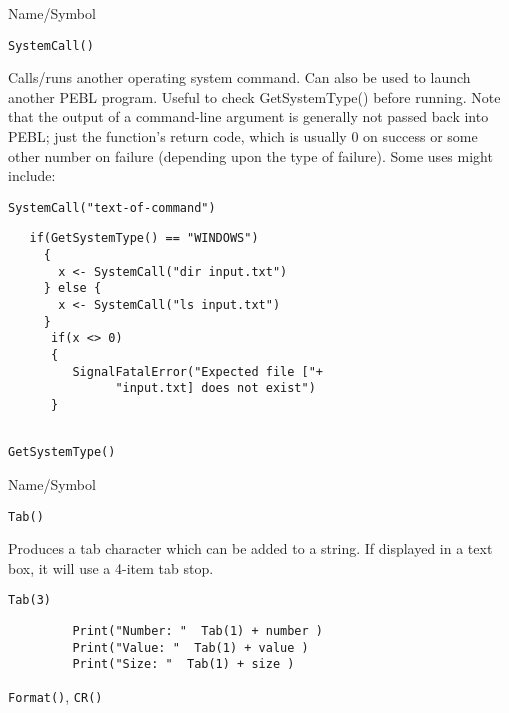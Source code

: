 \begin{desc}{Name/Symbol}
\item[Name/Symbol]  	\verb+SystemCall()+

\item[Description] Calls/runs another operating system command.  Can also be used to 
launch another PEBL program.  Useful to check GetSystemType() before running.
 Note that the output of a
   command-line argument is generally not passed back into PEBL; just
   the function's return code, which is usually 0 on success or some
   other number on failure (depending upon the type of failure).  Some
   uses might include:

\item[Usage]		
\begin{verbatim}
SystemCall("text-of-command")
\end{verbatim}

\item[Example]	
\begin{verbatim}
   if(GetSystemType() == "WINDOWS")
     {
       x <- SystemCall("dir input.txt") 
     } else {
       x <- SystemCall("ls input.txt") 
     }
      if(x <> 0)
      {
         SignalFatalError("Expected file ["+
               "input.txt] does not exist")
      }


\end{verbatim}

\item[See Also]	
  \verb+GetSystemType()+
\end{desc}

\vfill
\newpage
{}
\vfill



\begin{desc}{Name/Symbol}

\item[Name/Symbol] \verb+Tab()+

\item[Description]  Produces a tab character which can be added to a
  string. If displayed in a text box, it will use a 4-item tab stop.

\item[Usage]        \verb!Tab(3)!


\item[Example]     
\begin{verbatim}
         Print("Number: "  Tab(1) + number )
         Print("Value: "  Tab(1) + value )
         Print("Size: "  Tab(1) + size )
\end{verbatim}
\item[See Also]
\verb+Format()+, \verb+CR()+
\end{desc}




